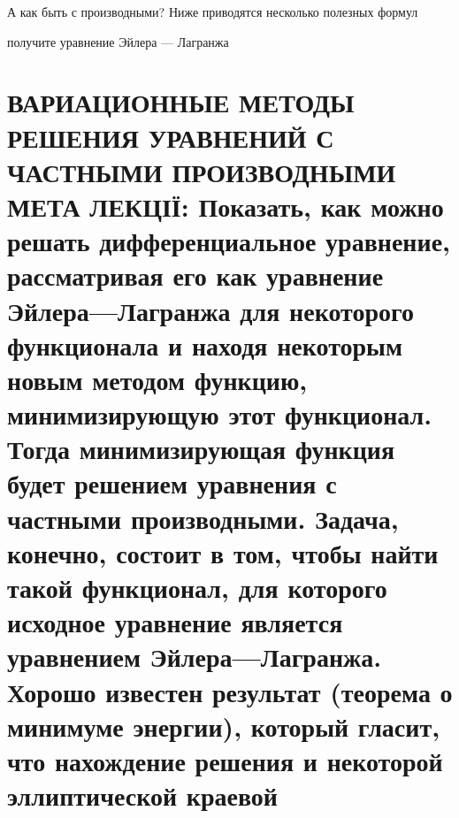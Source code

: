 \documentclass[
  ukrainian,
]{article}
\begin{document}
А как быть с производными? Ниже приводятся несколько полезных формул

получите уравнение Эйлера --- Лагранжа

\section{ВАРИАЦИОННЫЕ МЕТОДЫ РЕШЕНИЯ УРАВНЕНИЙ С ЧАСТНЫМИ ПРОИЗВОДНЫМИ
МЕТА ЛЕКЦІЇ: Показать, как можно решать дифференциальное уравнение,
рассматривая его как уравнение Эйлера---Лагранжа для некоторого
функционала и находя некоторым новым методом функцию, минимизирующую
этот функционал. Тогда минимизирующая функция будет решением уравнения с
частными производными. Задача, конечно, состоит в том, чтобы найти такой
функционал, для которого исходное уравнение является уравнением
Эйлера---Лагранжа. Хорошо известен результат (теорема о минимуме
энергии), который гласит, что нахождение решения и некоторой
эллиптической краевой
}
\end{document}
